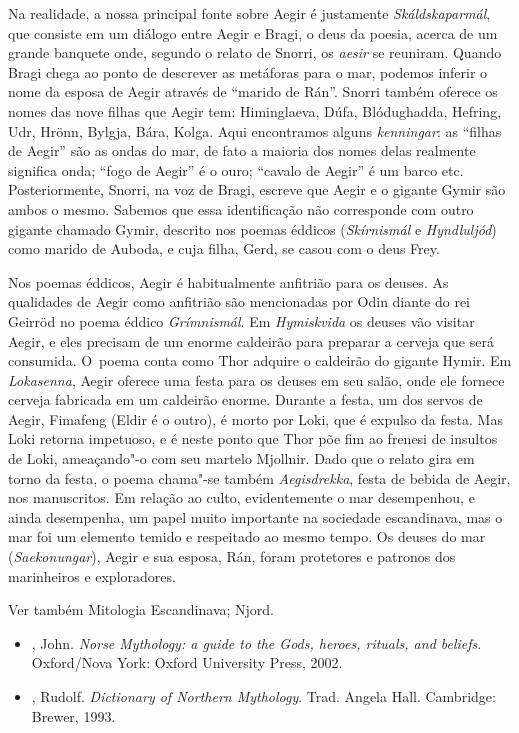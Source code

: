 Na realidade, a nossa principal fonte sobre Aegir é justamente
\emph{Skáldskaparmál}, que consiste em um diálogo entre Aegir e Bragi, o
deus da poesia, acerca de um grande banquete onde, segundo o relato de
Snorri, os \emph{aesir} se reuniram. Quando Bragi chega ao ponto de
descrever as metáforas para o mar, podemos inferir o nome da esposa de
Aegir através de ``marido de Rán''. Snorri também oferece os nomes das
nove filhas que Aegir tem: Himinglaeva, Dúfa, Blódughadda, Hefring, Udr,
Hrönn, Bylgja, Bára, Kolga. Aqui encontramos alguns \emph{kenningar}: as
``filhas de Aegir'' são as ondas do mar, de fato a maioria dos nomes
delas realmente significa onda; ``fogo de Aegir'' é o ouro; ``cavalo de
Aegir'' é um barco etc. Posteriormente, Snorri, na voz de Bragi, escreve
que Aegir e o gigante Gymir são ambos o mesmo. Sabemos que essa
identificação não corresponde com outro gigante chamado Gymir, descrito
nos poemas éddicos (\emph{Skírnismál} e \emph{Hyndluljód}) como marido
de Auboda, e cuja filha, Gerd, se casou com o deus Frey.

Nos poemas éddicos, Aegir é habitualmente anfitrião para os deuses. As
qualidades de Aegir como anfitrião são mencionadas por Odin diante do
rei Geirröd no poema éddico \emph{Grímnismál}. Em \emph{Hymiskvida} os
deuses vão visitar Aegir, e eles precisam de um enorme caldeirão para
preparar a cerveja que será consumida. O~poema conta como Thor adquire o
caldeirão do gigante Hymir. Em \emph{Lokasenna}, Aegir oferece uma festa
para os deuses em seu salão, onde ele fornece cerveja fabricada em um
caldeirão enorme. Durante a festa, um dos servos de Aegir, Fimafeng
(Eldir é o outro), é morto por Loki, que é expulso da festa. Mas Loki
retorna impetuoso, e é neste ponto que Thor põe fim ao frenesi de
insultos de Loki, ameaçando"-o com seu martelo Mjollnir. Dado que o
relato gira em torno da festa, o poema chama"-se também
\emph{Aegisdrekka}, festa de bebida de Aegir, nos manuscritos. Em
relação ao culto, evidentemente o mar desempenhou, e ainda desempenha,
um papel muito importante na sociedade escandinava, mas o mar foi um
elemento temido e respeitado ao mesmo tempo. Os deuses do mar
(\emph{Saekonungar}), Aegir e sua esposa, Rán, foram protetores e
patronos dos marinheiros e exploradores.

Ver também Mitologia Escandinava; Njord.



\begin{itemize}\footnotesize
\item
  , John. \emph{Norse Mythology: a guide to the Gods, heroes,
  rituals, and beliefs}. Oxford/Nova York: Oxford University Press, 2002.
\item
  , Rudolf. \emph{Dictionary of Northern Mythology}. Trad. Angela
  Hall. Cambridge: Brewer, 1993.
\end{itemize}

